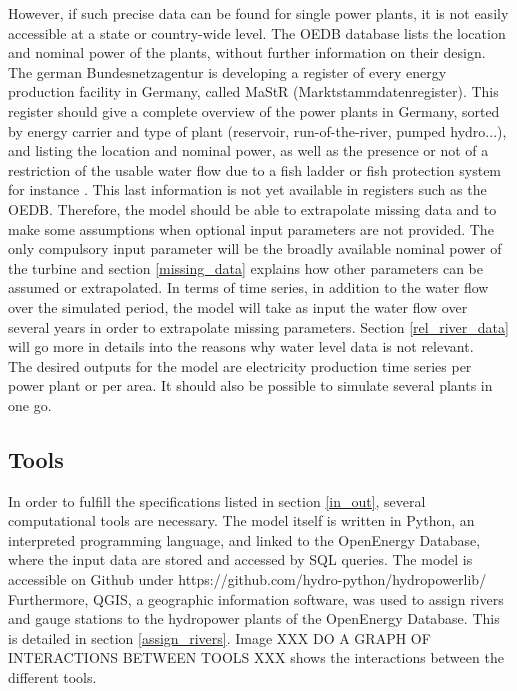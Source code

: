 However, if such precise data can be found for single power plants, it is not easily accessible at a state or country-wide level. The OEDB database lists the location and nominal power of the plants, without further information on their design. The german Bundesnetzagentur is developing a register of every energy production facility in Germany, called MaStR (Marktstammdatenregister). This register should give a complete overview of the power plants in Germany, sorted by energy carrier and type of plant (reservoir, run-of-the-river, pumped hydro...), and listing the location and nominal power, as well as the presence or not of a restriction of the usable water flow due to a fish ladder or fish protection system for instance \cite{MaStR}. This last information is not yet available in registers such as the OEDB.\newline
Therefore, the model should be able to extrapolate missing data and to make some assumptions when optional input parameters are not provided. The only compulsory input parameter will be the broadly available nominal power of the turbine and section \ref{missing_data} explains how other parameters can be assumed or extrapolated. \newline
In terms of time series, in addition to the water flow over the simulated period, the model will take as input the water flow over several years in order to extrapolate missing parameters. Section \ref{rel_river_data} will go more in details into the reasons why water level data is not relevant. \\
The desired outputs for the model are electricity production time series per power plant or per area. It should also be possible to simulate several plants in one go.


\subsection{Tools}

In order to fulfill the specifications listed in section \ref{in_out}, several computational tools are necessary. The model itself is written in Python, an interpreted programming language, and linked to the OpenEnergy Database, where the input data are stored and accessed by SQL queries. The model is accessible on Github under https://github.com/hydro-python/hydropowerlib/
Furthermore, QGIS, a geographic information software, was used to assign rivers and gauge stations to the hydropower plants of the OpenEnergy Database. This is detailed in section \ref{assign_rivers}. Image XXX DO A GRAPH OF INTERACTIONS BETWEEN TOOLS XXX shows the interactions between the different tools.
